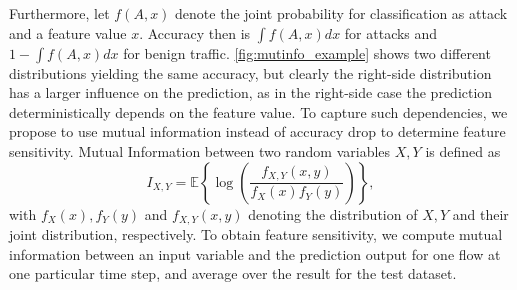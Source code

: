 \documentclass[conference]{IEEEtran}
\newcommand\note[2]{{\color{#1}#2}}
\newcommand\todo[1]{{\note{red}{TODO: #1}}}
\begin{document}
Furthermore, let $f(A,x)$  denote the joint probability
for classification as attack and a feature value $x$. Accuracy then is $\int f(A,x) dx$ for attacks and $1-\int f(A,x) dx$ for benign traffic.
\autoref{fig:mutinfo_example} shows two different distributions
yielding the same accuracy, but clearly the right-side distribution has a larger influence on the prediction, as in the right-side case the prediction deterministically depends on the feature value.
To capture such dependencies, we propose to use mutual information instead of accuracy drop to determine feature sensitivity.
Mutual Information between two random variables $X,Y$ is defined as 
\begin{equation}
I_{X,Y} = \mathbb E \left\{ \log\left(\frac{f_{X,Y}(x,y)}{f_X(x)f_Y(y)}\right) \right\},
\end{equation}
with $f_X(x), f_Y(y)$ and $f_{X,Y}(x,y)$ denoting the distribution of $X,Y$ and their joint distribution, respectively. To obtain feature sensitivity, we compute mutual information between an input variable and the prediction output for one flow at one particular time step, and average over the result for the test dataset.
\end{document}
